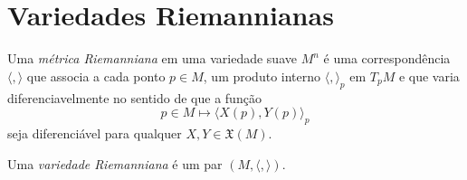 \section{Variedades Riemannianas}

\begin{definicao}
	Uma \emph{métrica Riemanniana} em uma variedade suave $M^n$ é uma correspondência $\langle , \rangle$ que associa a cada ponto $p \in M$, um produto interno $\langle , \rangle_p$ em $T_p M$ e que varia diferenciavelmente no sentido de que a função
	\begin{equation*}
		p \in M \mapsto \langle X(p), Y(p) \rangle_p
	\end{equation*}	
	seja diferenciável para qualquer $X,Y \in \mathfrak{X}(M)$.
\end{definicao}

\begin{definicao}
	Uma \emph{variedade Riemanniana} é um par $(M, \langle , \rangle)$.
\end{definicao}

